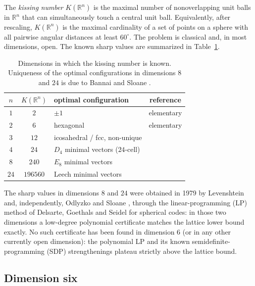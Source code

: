 \documentclass[11pt,reqno]{amsart}
\theoremstyle{plain}
\theoremstyle{definition}
\theoremstyle{remark}
\newcommand{\R}{\mathbb{R}}
\begin{document}
The \emph{kissing number} $K(\R^n)$ is the maximal number of
nonoverlapping unit balls in $\R^n$ that can simultaneously touch a
central unit ball.  Equivalently, after rescaling, $K(\R^n)$ is the
maximal cardinality of a set of points on a sphere with all pairwise
angular distances at least $60^\circ$.  The problem is classical and,
in most dimensions, open.  The known sharp values are summarized in
Table~\ref{tab:known}.

\begin{table}[ht]
\centering
\begin{tabular}{cclc}
\toprule
$n$ & $K(\R^n)$ & optimal configuration & reference \\
\midrule
$1$ & $2$ & $\pm 1$ & elementary \\
$2$ & $6$ & hexagonal & elementary \\
$3$ & $12$ & icosahedral / fcc, non-unique & \cite{SchuetteWaerden1953} \\
$4$ & $24$ & $D_4$ minimal vectors ($24$-cell) & \cite{Musin2008} \\
$8$ & $240$ & $E_8$ minimal vectors & \cite{Levenshtein1979,OdlyzkoSloane1979} \\
$24$ & $196560$ & Leech minimal vectors & \cite{Levenshtein1979,OdlyzkoSloane1979} \\
\bottomrule
\end{tabular}
\medskip
\caption{Dimensions in which the kissing number is known.  Uniqueness
of the optimal configurations in dimensions $8$ and $24$ is due to
Bannai and Sloane \cite{BannaiSloane1981}.}
\label{tab:known}
\end{table}

The sharp values in dimensions $8$ and $24$ were obtained in 1979 by
Levenshtein \cite{Levenshtein1979} and, independently, Odlyzko and
Sloane \cite{OdlyzkoSloane1979}, through the linear-programming (LP)
method of Delsarte, Goethals and Seidel \cite{DGS1977} for spherical
codes: in those two dimensions a low-degree polynomial certificate
matches the lattice lower bound exactly.  No such certificate has
been found in dimension $6$ (or in any other currently open
dimension): the polynomial LP and its known semidefinite-programming
(SDP) strengthenings plateau strictly above the lattice bound.

\subsection{Dimension six}\label{subsec:dimsix}
\end{document}
